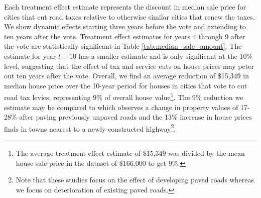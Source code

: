 \noindent  Each treatment effect estimate represents the discount in median sale price for cities that cut road taxes relative to otherwise similar cities that renew the taxes. We show dynamic effects starting three years before the vote and extending to ten years after the vote. Treatment effect estimates for years 4 through 9 after the vote are statistically significant in Table \ref{tab:median_sale_amount}. The estimate for year $t + 10$ has a smaller estimate and is only significant at the 10\% level, suggesting that the effect of tax and service cuts on house prices may peter out ten years after the vote. Overall, we find an average reduction of \$15,349 in median house price over the 10-year period for houses in cities that vote to cut road tax levies, representing 9\% of overall house value\footnote{The average treatment effect estimate of \$15,349 was divided by the mean house sale price in the dataset of \$166,000 to get 9\%.}. The 9\% reduction we estimate may be compared to \cite{gonzalez2016paving} which observes a change in property values of 17-28\% after paving previously unpaved roads and the 13\% increase in house prices \cite{theisen2021road} finds in towns nearest to a newly-constructed highway\footnote{Note that these studies focus on the effect of developing paved roads whereas we focus on deterioration of existing paved roads.}.

